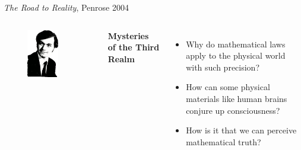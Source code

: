 \documentclass[xcolor=dvipsnames]{beamer}
\begin{document}
\begin{frame}{\emph{The Road to Reality}, Penrose 2004}
  \centering
  \begin{columns}
    \centering
    \begin{figure}
    \centering
    \includegraphics[width=0.7\textwidth]{r-penrose}
  \end{figure}
    \textbf{Mysteries of the Third Realm}
    \begin{itemize}
\item Why do mathematical laws apply to the physical world with such precision?
\item How can some physical materials like human brains conjure up consciousness?
\item How is it that we can perceive mathematical truth?
    \end{itemize}
  \end{columns}
\end{frame}
\end{document}
